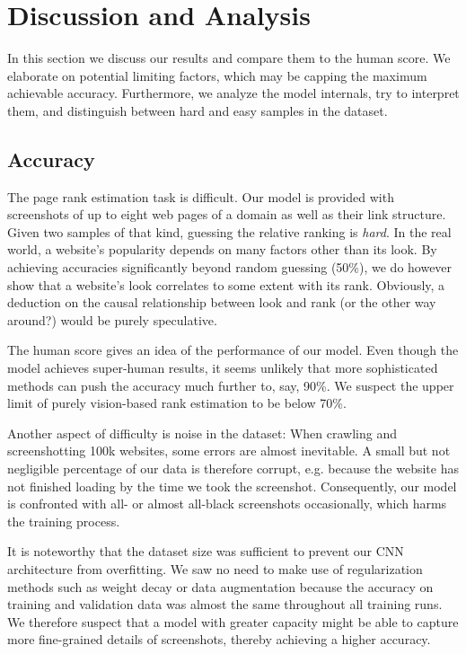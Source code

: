 \section{Discussion and Analysis}
\label{sec:discussion}

In this section we discuss our results and compare them to the human score. We elaborate on potential limiting factors, which may be capping the maximum achievable accuracy. Furthermore, we analyze the model internals, try to interpret them, and distinguish between hard and easy samples in the dataset.

\subsection{Accuracy}

The page rank estimation task is difficult. Our model is provided with screenshots of up to eight web pages of a domain as well as their link structure. Given two samples of that kind, guessing the relative ranking is \textit{hard}. In the real world, a website's popularity depends on many factors other than its look. By achieving accuracies significantly beyond random guessing (50\%), we do however show that a website's look correlates to some extent with its rank. Obviously, a deduction on the causal relationship between look and rank (or the other way around?) would be purely speculative.

The human score gives an idea of the performance of our model. Even though the model achieves super-human results, it seems unlikely that more sophisticated methods can push the accuracy much further to, say, 90\%. We suspect the upper limit of purely vision-based rank estimation to be below 70\%.

Another aspect of difficulty is noise in the dataset: When crawling and screenshotting 100k websites, some errors are almost inevitable. A small but not negligible percentage of our data is therefore corrupt, e.g. because the website has not finished loading by the time we took the screenshot. Consequently, our model is confronted with all- or almost all-black screenshots occasionally, which harms the training process.

It is noteworthy that the dataset size was sufficient to prevent our CNN architecture from overfitting. We saw no need to make use of regularization methods such as weight decay or data augmentation because the accuracy on training and validation data was almost the same throughout all training runs. We therefore suspect that a model with greater capacity might be able to capture more fine-grained details of screenshots, thereby achieving a higher accuracy.

